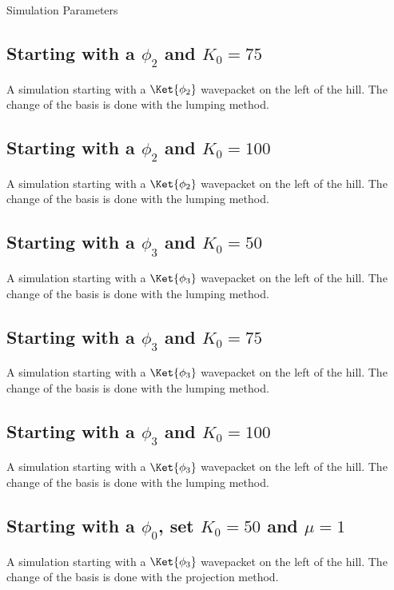 \begin{chapter}{Simulation Parameters}
\subsection{Starting with a $\phi_2$ and $K_0=75$}
\label{cfg:eckart_phi2_K075}
A simulation starting with a $\Ket{\phi_2}$ wavepacket on the left of the hill.
The change of the basis is done with the lumping method.

\subsection{Starting with a $\phi_2$ and $K_0=100$}
\label{cfg:eckart_phi2_K0100}
A simulation starting with a $\Ket{\phi_2}$ wavepacket on the left of the hill.
The change of the basis is done with the lumping method.

\subsection{Starting with a $\phi_3$ and $K_0=50$}
\label{cfg:eckart_phi3_K050}
A simulation starting with a $\Ket{\phi_3}$ wavepacket on the left of the hill.
The change of the basis is done with the lumping method.

\subsection{Starting with a $\phi_3$ and $K_0=75$}
\label{cfg:eckart_phi3_K075}
A simulation starting with a $\Ket{\phi_3}$ wavepacket on the left of the hill.
The change of the basis is done with the lumping method.

\subsection{Starting with a $\phi_3$ and $K_0=100$}
\label{cfg:eckart_phi3_K0100}
A simulation starting with a $\Ket{\phi_3}$ wavepacket on the left of the hill.
The change of the basis is done with the lumping method.


\subsection{Starting with a $\phi_0$, set $K_0=50$ and $\mu=1$}
\label{cfg:eckart_phi0_mu1}
A simulation starting with a $\Ket{\phi_3}$ wavepacket on the left of the hill.
The change of the basis is done with the projection method.


\end{chapter}
